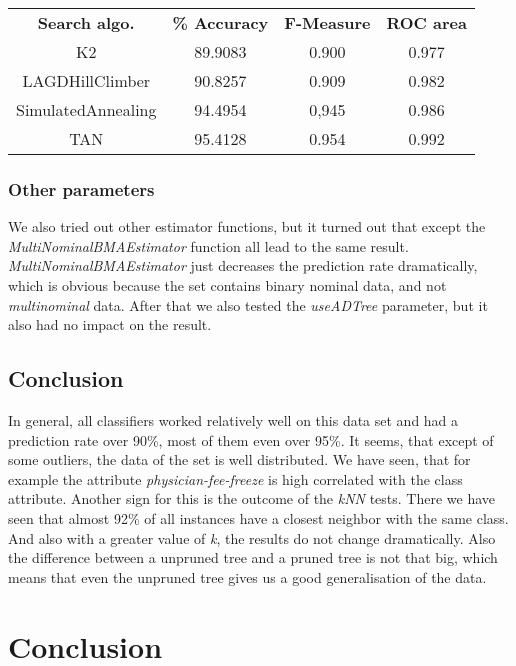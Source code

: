 \documentclass{article}
\begin{document}
\begin{center}
\begin{tabular}{ c | c | c | c }
\textbf{Search algo.} & \textbf{\% Accuracy} & \textbf{F-Measure} & \textbf{ROC area} \\
K2 & 89.9083 & 0.900 & 0.977 \\
LAGDHillClimber & 90.8257 & 0.909 & 0.982 \\
SimulatedAnnealing & 94.4954  & 0,945 & 0.986 \\
TAN & 95.4128 & 0.954 & 0.992 \\
\end{tabular}
\end{center}



 
\subsubsection{Other parameters}

We also tried out other estimator functions, but it turned out that except the \emph{MultiNominalBMAEstimator} function all lead to the same result. \emph{MultiNominalBMAEstimator} just decreases the prediction rate dramatically, which is obvious because the set contains binary nominal data, and not \emph{multinominal} data. After that we also tested the \emph{useADTree} parameter, but it also had no impact on the result. 

\subsection{Conclusion}

In general, all classifiers worked relatively well on this data set and had a prediction rate over 90\%, most of them even over 95\%. It seems, that except of some outliers, the data of the set is well distributed. We have seen, that for example the attribute \emph{physician-fee-freeze} is high correlated with the class attribute. Another sign for this is the outcome of the \emph{kNN} tests. There we have seen that almost 92\% of all instances have a closest neighbor with the same class. And also with a greater value of \emph{k}, the results do not change dramatically. Also the difference between a unpruned tree and a pruned tree is not that big, which means that even the unpruned tree gives us a good generalisation of the data. 
 
 

\section{Conclusion}
\end{document}
